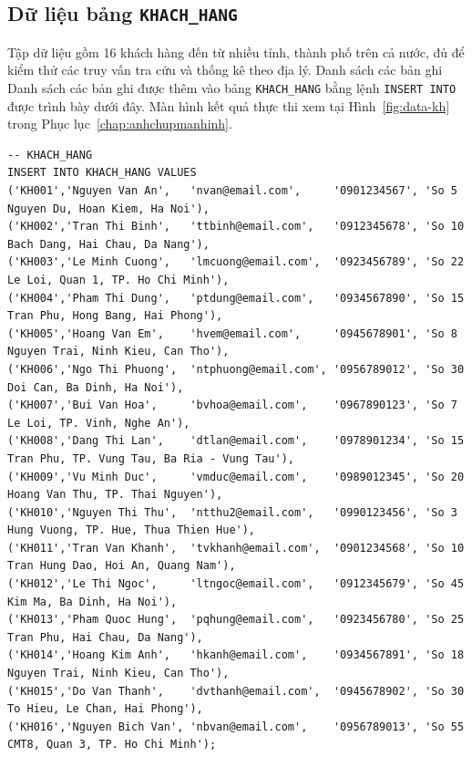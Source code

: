 \documentclass[11pt]{report}
\begin{document}

\subsection{Dữ liệu bảng \texttt{KHACH\_HANG}}

Tập dữ liệu gồm 16 khách hàng đến từ nhiều tỉnh, thành phố trên cả nước, đủ để kiểm thử các truy vấn tra cứu và thống kê theo địa lý. Danh sách các bản ghi Danh sách các bản ghi được thêm vào bảng \texttt{KHACH\_HANG} bằng lệnh \texttt{INSERT INTO} được trình bày dưới đây. Màn hình kết quả thực thi xem tại Hình~\ref{fig:data-kh} trong Phục lục~\ref{chap:anhchupmanhinh}.

\begin{verbatim}
-- KHACH_HANG
INSERT INTO KHACH_HANG VALUES
('KH001','Nguyen Van An',   'nvan@email.com',     '0901234567', 'So 5 Nguyen Du, Hoan Kiem, Ha Noi'),
('KH002','Tran Thi Binh',   'ttbinh@email.com',   '0912345678', 'So 10 Bach Dang, Hai Chau, Da Nang'),
('KH003','Le Minh Cuong',   'lmcuong@email.com',  '0923456789', 'So 22 Le Loi, Quan 1, TP. Ho Chi Minh'),
('KH004','Pham Thi Dung',   'ptdung@email.com',   '0934567890', 'So 15 Tran Phu, Hong Bang, Hai Phong'),
('KH005','Hoang Van Em',    'hvem@email.com',     '0945678901', 'So 8 Nguyen Trai, Ninh Kieu, Can Tho'),
('KH006','Ngo Thi Phuong',  'ntphuong@email.com', '0956789012', 'So 30 Doi Can, Ba Dinh, Ha Noi'),
('KH007','Bui Van Hoa',     'bvhoa@email.com',    '0967890123', 'So 7 Le Loi, TP. Vinh, Nghe An'),
('KH008','Dang Thi Lan',    'dtlan@email.com',    '0978901234', 'So 15 Tran Phu, TP. Vung Tau, Ba Ria - Vung Tau'),
('KH009','Vu Minh Duc',     'vmduc@email.com',    '0989012345', 'So 20 Hoang Van Thu, TP. Thai Nguyen'),
('KH010','Nguyen Thi Thu',  'ntthu2@email.com',   '0990123456', 'So 3 Hung Vuong, TP. Hue, Thua Thien Hue'),
('KH011','Tran Van Khanh',  'tvkhanh@email.com',  '0901234568', 'So 10 Tran Hung Dao, Hoi An, Quang Nam'),
('KH012','Le Thi Ngoc',     'ltngoc@email.com',   '0912345679', 'So 45 Kim Ma, Ba Dinh, Ha Noi'),
('KH013','Pham Quoc Hung',  'pqhung@email.com',   '0923456780', 'So 25 Tran Phu, Hai Chau, Da Nang'),
('KH014','Hoang Kim Anh',   'hkanh@email.com',    '0934567891', 'So 18 Nguyen Trai, Ninh Kieu, Can Tho'),
('KH015','Do Van Thanh',    'dvthanh@email.com',  '0945678902', 'So 30 To Hieu, Le Chan, Hai Phong'),
('KH016','Nguyen Bich Van', 'nbvan@email.com',    '0956789013', 'So 55 CMT8, Quan 3, TP. Ho Chi Minh');
\end{verbatim}
\end{document}
